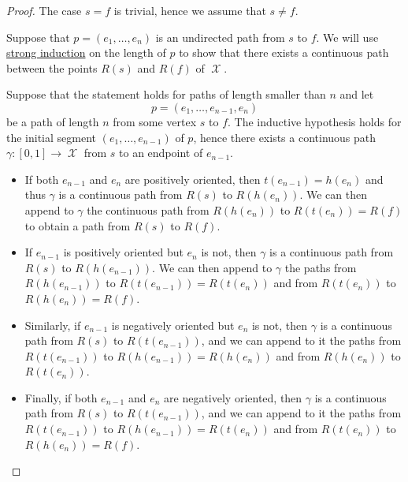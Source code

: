\begin{proof}
  The case \( s = f \) is trivial, hence we assume that \( s \neq f \).

   Suppose that \( p = (e_1, \ldots, e_n) \) is an undirected path from \( s \) to \( f \). We will use \hyperref[rem:induction/well_founded]{strong induction} on the length of \( p \) to show that there exists a continuous path between the points \( R(s)  \) and \( R(f)  \) of \( \mscrX \).

  Suppose that the statement holds for paths of length smaller than \( n \) and let
  \begin{equation*}
    p = (e_1, \ldots, e_{n-1}, e_n)
  \end{equation*}
  be a path of length \( n \) from some vertex \( s \) to \( f \). The inductive hypothesis holds for the initial segment \( (e_1, \ldots, e_{n-1}) \) of \( p \), hence there exists a continuous path \( \gamma: [0, 1] \to \mscrX \) from \( s \) to an endpoint of \( e_{n-1} \).
  \begin{itemize}
    \item If both \( e_{n-1} \) and \( e_n \) are positively oriented, then \( t(e_{n-1}) = h(e_n) \) and thus \( \gamma \) is a continuous path from \( R(s)  \) to \( R(h(e_n)) \). We can then append to \( \gamma \) the continuous path from \( R(h(e_n)) \) to \( R(t(e_n)) = R(f)  \) to obtain a path from \( R(s)  \) to \( R(f)  \).

    \item If \( e_{n-1} \) is positively oriented but \( e_n \) is not, then \( \gamma \) is a continuous path from \( R(s)  \) to \( R(h(e_{n-1})) \). We can then append to \( \gamma \) the paths from \( R(h(e_{n-1})) \) to \( R(t(e_{n-1})) = R(t(e_n)) \) and from \( R(t(e_n)) \) to \( R(h(e_n)) = R(f)  \).

    \item Similarly, if \( e_{n-1} \) is negatively oriented but \( e_n \) is not, then \( \gamma \) is a continuous path from \( R(s)  \) to \( R(t(e_{n-1})) \), and we can append to it the paths from \( R(t(e_{n-1})) \) to \( R(h(e_{n-1})) = R(h(e_n)) \) and from \( R(h(e_n)) \) to \( R(t(e_n)) \).

    \item Finally, if both \( e_{n-1} \) and \( e_n \) are negatively oriented, then \( \gamma \) is a continuous path from \( R(s)  \) to \( R(t(e_{n-1})) \), and we can append to it the paths from \( R(t(e_{n-1})) \) to \( R(h(e_{n-1})) = R(t(e_n)) \) and from \( R(t(e_n)) \) to \( R(h(e_n)) = R(f)  \).
  \end{itemize}


\end{proof}
